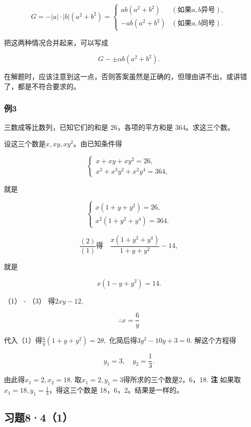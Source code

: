 \[
G = - | a | \cdot | b | (a^{2} + b^{2}) = \left\{ \begin{array}{ll} a b (a^{2} + b^{2}) & (\text{如果} a, b \text{异号}), \\ - a b (a^{2} + b^{2}) & (\text{如果} a, b \text{同号}). \end{array} \right.
\]

把这两种情况合并起来，可以写成

\[
G - \pm \alpha b (a^{2} + b^{2}).
\]

在解题时，应该注意到这一点，否则答案虽然是正确的，但理由讲不出，或讲错了，都是不符合要求的。

\subsubsection{例3}

三数成等比数列，已知它们的和是 26，各项的平方和是 364。求这三个数。

 设这三个数是\(x, xy, xy^2\)。由已知条件得

\[
\left\{ \begin{array}{c} x + x y + x y^{2} = 26, \\ x^{2} + x^{3} y^{2} + x^{2} y^{4} = 364, \end{array} \right.
\]

就是

\[
\left\{ \begin{array}{l} x (1 + y + y^{2}) = 26, \\ x^{2} (1 + y^{2} + y^{4}) = 364. \end{array} \right. \tag {1}
\]

\[
\frac{(2)}{(1)} \text{得} \quad \frac{x (1 + y^{2} + y^{4})}{1 + y + y^{2}} - 14,
\]

就是

\[
x (1 - y + y^{2}) = 14. \tag {3}
\]

（1） - （3） 得\(2xy - 12,\)

\[
\therefore x = \frac{6}{y}
\]

代入（1）得\(\frac{6}{y} (1 + y + y^2) = 2\theta,\)
化简后得\(3y^{2} - 10y + 3 = 0.\) 解这个方程得

\[
y_{1} = 3, \quad y_{2} = \frac{1}{3}.
\]

由此得\(x_{1} = 2, x_{2} = 18.\)
取\(x_{1} = 2, y_{1} = 3\)得所求的三个数是2，6，18. \textbf{注}
如果取\(x_{1} = 18, y_{1} = \frac{1}{3}\)，得这三个数是
18，6，2。结果是一样的。

\subsection{习题8·4（1）}


